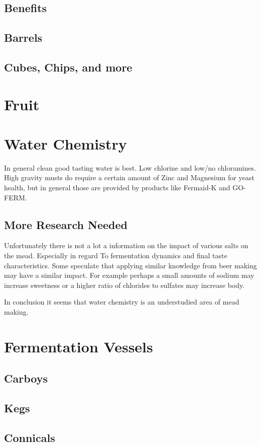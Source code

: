 \documentclass{article}
\begin{document}
{ \subsection{Benefits}
 \subsection{Barrels}
 \subsection{Cubes, Chips, and more}

\section{Fruit}

\section{Water Chemistry}
 In general clean good tasting water is best. Low chlorine and low/no chloramines. High gravity musts do require 
 a certain amount of Zinc and Magnesium for yeast health, but in general those are provided by products like
 Fermaid-K and GO-FERM.
 \subsection{More Research Needed}
  Unfortunately there is not a lot a information on the impact of various salts on the mead. Especially in regard
  To fermentation dynamics and final taste characteristics. Some speculate that applying similar knowledge from 
  beer making may have a similar impact. For example perhaps a small amounts of sodium may increase sweetness 
  or a higher ratio of chlorides to sulfates may increase body. 

  In conclusion it seems that water chemistry is an understudied area of mead making.
\section{Fermentation Vessels}
 \subsection{Carboys}
 \subsection{Kegs}
 \subsection{Connicals}
}
\end{document}
